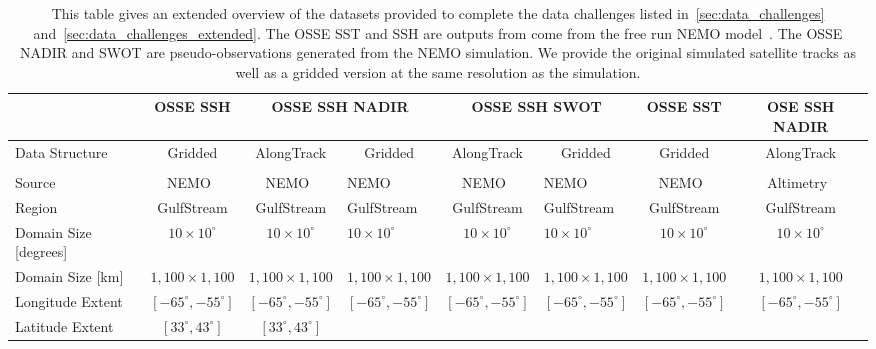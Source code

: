 \begin{landscape}
\begin{table}[ht]
\caption{This table gives an extended overview of the datasets provided to complete the data challenges listed in~\ref{sec:data_challenges} and~\ref{sec:data_challenges_extended}. The OSSE SST and SSH are outputs from come from the free run NEMO model~\citep{NEMOAJAYI2020}. The OSSE NADIR and SWOT are pseudo-observations generated from the NEMO simulation. We provide the original simulated satellite tracks as well as a gridded version at the same resolution as the simulation. 
}
\label{tb:datasets-mega}
\centering
\begin{tabular}{lcclclcc}
 \toprule
     & OSSE SSH      & \multicolumn{2}{c}{OSSE SSH NADIR}                     & \multicolumn{2}{c}{OSSE SSH SWOT}                      & OSSE SST             & OSE SSH NADIR            \\ \midrule\midrule
Data Structure & Gridded              & AlongTrack           & \multicolumn{1}{c}{Gridded} & AlongTrack           & \multicolumn{1}{c}{Gridded} & Gridded              & AlongTrack           \\
     & \multicolumn{1}{l}{} & \multicolumn{1}{l}{} &                             & \multicolumn{1}{l}{} &  \\ \midrule
Source     & 
NEMO~\citep{NEMOAJAYI2020} &
NEMO~\citep{NEMOAJAYI2020} &
NEMO~\citep{NEMOAJAYI2020} &
NEMO~\citep{NEMOAJAYI2020} & 
NEMO~\citep{NEMOAJAYI2020} &
NEMO~\citep{NEMOAJAYI2020}
& Altimetry~\citep{MDSALONGTRACK} \\
Region & 
GulfStream & GulfStream & GulfStream & GulfStream &
GulfStream & GulfStream & GulfStream
\\
Domain Size [degrees] &
$10\times 10^\circ$ &
$10\times 10^\circ$ &
$10\times 10^\circ$ &
$10\times 10^\circ$ &
$10\times 10^\circ$ &
$10\times 10^\circ$ &
$10\times 10^\circ$ \\
Domain Size [km] &
$1,100\times 1,100$ &
$1,100\times 1,100$ &
$1,100\times 1,100$ &
$1,100\times 1,100$ &
$1,100\times 1,100$ &
$1,100\times 1,100$ &
$1,100\times 1,100$ \\
Longitude Extent &
$[-65^\circ, -55^\circ]$ & 
$[-65^\circ, -55^\circ]$ & 
$[-65^\circ, -55^\circ]$ & 
$[-65^\circ, -55^\circ]$ & 
$[-65^\circ, -55^\circ]$ &
$[-65^\circ, -55^\circ]$ &
$[-65^\circ, -55^\circ]$ \\
Latitude Extent &
$[33^\circ, 43^\circ]$ &
$[33^\circ, 43^\circ]$ &

\end{tabular}
\end{table}
\end{landscape}
